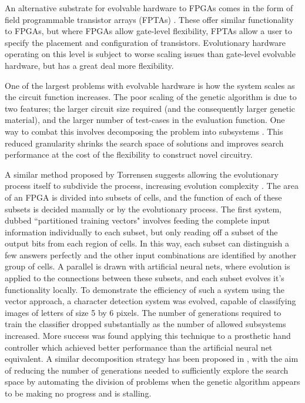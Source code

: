 An alternative substrate for evolvable hardware to FPGAs comes in the form of field
programmable transistor arrays (FPTAs) \cite{869347}. These offer similar functionality
to FPGAs, but where FPGAs allow gate-level flexibility, FPTAs allow a user to specify
the placement and configuration of transistors. Evolutionary hardware operating on this
level is subject to worse scaling issues than gate-level evolvable hardware, but has a
great deal more flexibility.

One of the largest problems with evolvable hardware is how the system scales as the
circuit function increases. The poor scaling of the genetic algorithm is due to two
features; the larger circuit size required (and the consequently larger genetic material),
and the larger number of test-cases in the evaluation function. One way to combat this
involves decomposing the problem into subsystems \cite{10.1007/978-3-540-46239-2_5}.
This reduced granularity shrinks the search space of solutions and improves search
performance at the cost of the flexibility to construct novel circuitry.

A similar method proposed by Torrensen suggests allowing the evolutionary
process itself to subdivide the process, increasing evolution complexity \cite{Torresen2002}. The area
of an FPGA is divided into subsets of cells, and the function of each of these
subsets is decided manually or by the evolutionary process.
The first system, dubbed ``partitioned training vectors" involves feeding the
complete input information individually to each subset, but only reading off
a subset of the output bits from each region of cells. In this way, each subset
can distinguish a few answers perfectly and the other input combinations are
identified by another group of cells.
A parallel is drawn
with artificial neural nets, where evolution is applied to the connections between
these subsets, and each subset evolves it's functionality locally. To demonstrate
the efficiency of such a system using the vector approach, a character detection system was evolved, capable
of classifying images of letters of size 5 by 6 pixels. The number of generations
required to train the classifier dropped substantially as the number of allowed subsystems
increased. More success was found applying this technique to a prosthetic hand controller
which achieved better performance than the artificial neural net equivalent.
A similar decomposition strategy has been proposed in \cite{1703646}, with the
aim of reducing the number of generations needed to sufficiently explore the search
space by automating the division of problems when the genetic algorithm appears to
be making no progress and is stalling.

